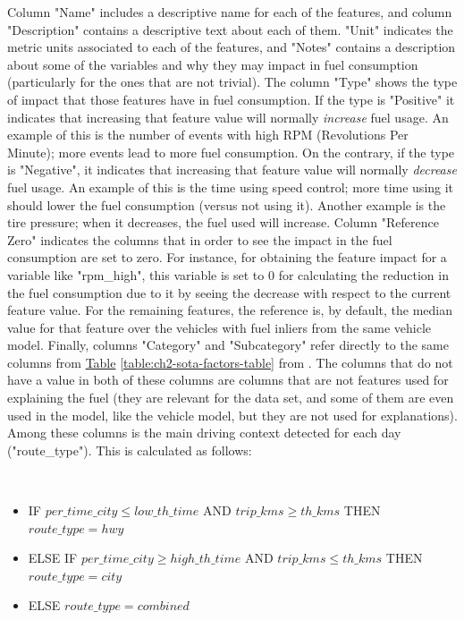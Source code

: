 Column "Name" includes a descriptive name for each of the features, and column "Description" contains a descriptive text about each of them. "Unit" indicates the metric units associated to each of the features, and "Notes" contains a description about some of the variables and why they may impact in fuel consumption (particularly for the ones that are not trivial). The column "Type" shows the type of impact that those features have in fuel consumption. If the type is "Positive" it indicates that increasing that feature value will normally \textit{increase} fuel usage. An example of this is the number of events with high RPM (Revolutions Per Minute); more events lead to more fuel consumption. On the contrary, if the type is "Negative", it indicates that increasing that feature value will normally \textit{decrease} fuel usage. An example of this is the time using speed control; more time using it should lower the fuel consumption (versus not using it). Another example is the tire pressure; when it decreases, the fuel used will increase. Column "Reference Zero" indicates the columns that in order to see the impact in the fuel consumption are set to zero. For instance, for obtaining the feature impact for a variable like "rpm\_high", this variable is set to 0 for calculating the reduction in the fuel consumption due to it by seeing the decrease with respect to the current feature value. For the remaining features, the reference is, by default, the median value for that feature over the vehicles with fuel inliers from the same vehicle model.
Finally, columns "Category" and "Subcategory" refer directly to the same columns from \hyperref[table:ch2-sota-factors-table]{Table} \ref{table:ch2-sota-factors-table} from \parencite{zacharof2016review}. The columns that do not have a value in both of these columns are columns that are not features used for explaining the fuel (they are relevant for the data set, and some of them are even used in the model, like the vehicle model, but they are not used for explanations). Among these columns is the main driving context detected for each day ("route\_type"). This is calculated as follows:


\newpage 

\ %

\newpage
\begin{itemize}
    \item IF $per\_time\_city \leq low\_th\_time$ AND $trip\_kms \geq th\_kms$ THEN $route\_type = hwy$
    \item ELSE IF $per\_time\_city \geq high\_th\_time$ AND $trip\_kms \leq th\_kms$ THEN $route\_type = city$
    \item ELSE $route\_type = combined$
\end{itemize}

